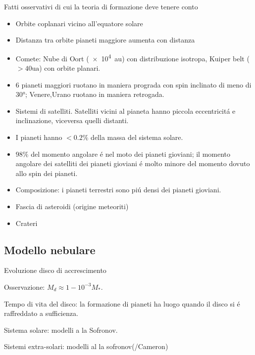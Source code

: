 \begin{wordonframe}{Fatti osservativi di cui la teoria di formazione deve tenere conto}

\begin{itemize}
\item Orbite coplanari vicino all'equatore solare
\item Distanza tra orbite pianeti maggiore aumenta con distanza
\item Comete: Nube di Oort (\SI{e4}{\astronomicalunit}) con distribuzione isotropa, Kuiper belt ($>40\si{\astronomicalunit}$) con orbite planari.
\item 6 pianeti maggiori ruotano in maniera prograda con spin inclinato di meno di \ang{30}; Venere,Urano ruotano in maniera retrogada.
\item Sistemi di satelliti. Satelliti vicini al pianeta hanno piccola eccentricit\'a e inclinazione, viceversa quelli distanti.
\item I pianeti hanno $<0.2\%$ della massa del sistema solare.
\item $98\%$ del momento angolare \'e nel moto dei pianeti gioviani; il momento angolare dei satelliti dei pianeti gioviani \'e molto minore del momento dovuto allo spin dei pianeti.
\item Composizione: i pianeti terrestri sono pi\'u densi dei pianeti gioviani.
\item Fascia di asteroidi (origine meteoriti)
\item Crateri

\end{itemize}

\end{wordonframe}

\subsection{Modello nebulare}

\begin{frame}{Evoluzione disco di accrescimento}

Osservazione: $M_{d}\approx1-10^{-3}M_*$.

Tempo di vita del disco: la formazione di pianeti ha luogo quando il disco si \'e raffreddato a sufficienza.

Sistema solare: modelli a la Sofronov.

Sistemi extra-solari: modelli al la sofronov(/Cameron)

\end{frame}


